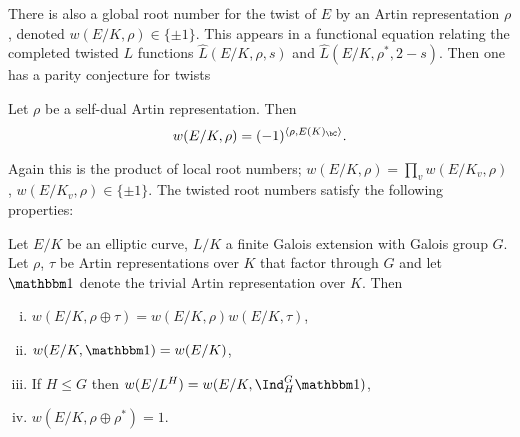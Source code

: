 \vspace{1em}
There is also a global root number for the twist of $E$ by an Artin representation $\rho$, denoted $w(E / K, \rho) \in \{ \pm 1 \}$. This appears in a functional equation relating the completed twisted $L$ functions $\hat{L}(E / K, \rho, s)$ and $\hat{L}(E / K, \rho^*, 2 - s)$. Then one has a parity conjecture for twists

\begin{conj}
   Let $\rho$ be a self-dual Artin representation. Then $$ w(E / K, \rho) = (-1)^{\langle \rho, E(K)_{\bC} \rangle}.$$
\end{conj}


Again this is the product of local root numbers; $w(E / K, \rho) = \prod_v w(E / K_v, \rho)$, $w(E / K_v, \rho) \in \{ \pm 1\}$. The twisted root numbers satisfy the following properties:

\begin{prop}\cite[Lemma A.1, Proposition A.2]{reg-const}\label{compute-root-twist}
    Let $E / K$ be an elliptic curve, $L / K$ a finite Galois extension with Galois group $G$. Let $\rho$, $\tau$ be Artin representations over $K$ that factor through $G$ and let $\trivial$ denote the trivial Artin representation over $K$. Then
    \begin{enumerate}[(i)]
        \setlength\itemsep{0em}
        \item $w(E / K, \rho \oplus \tau) = w(E / K, \rho) w(E / K, \tau)$,
        \item $w(E / K, \trivial) = w(E/ K)$, 
        \item If $H \leq G$ then $w(E / L^H) = w(E/ K, \Ind_{H}^G \trivial)$, 
        \item $w(E / K, \rho \oplus \rho^*) = 1$.
    \end{enumerate}
    
\end{prop}